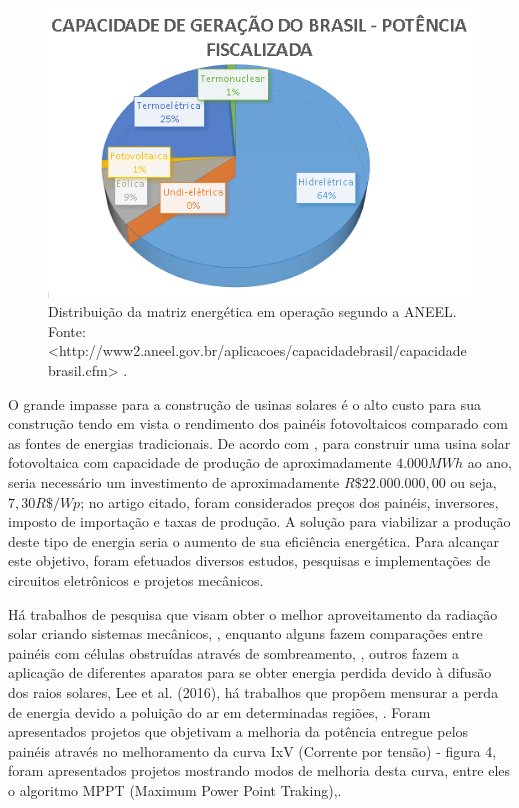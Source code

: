 \FloatBarrier
\begin{figure}[htbp]
	\centering
	\includegraphics[scale=1.0]{imagens/FontesEnergia}
	\caption{Distribuição da matriz energética em operação segundo a ANEEL. Fonte:<http://www2.aneel.gov.br/aplicacoes/capacidadebrasil/capacidadebrasil.cfm> \cite{aneel}. }
	
	\label{fig:FonteEnergia}
\end{figure}
\FloatBarrier

O grande impasse para a construção de usinas solares é o alto custo para sua construção tendo em vista o rendimento dos painéis fotovoltaicos comparado  com as fontes de energias tradicionais. De acordo com , para construir uma usina solar fotovoltaica com capacidade de produção de aproximadamente $4.000MWh$ ao ano, seria necessário um investimento de aproximadamente $R\$ 22.000.000,00$ ou seja, $7,30 R\$/Wp$; no artigo citado, foram considerados preços dos painéis, inversores, imposto de importação e taxas de produção. A solução para viabilizar a produção deste tipo de energia seria o aumento de sua eficiência energética. Para alcançar este objetivo, foram efetuados diversos estudos, pesquisas e implementações de circuitos eletrônicos e projetos mecânicos.
 
Há trabalhos de pesquisa que visam obter o melhor aproveitamento da radiação solar criando sistemas mecânicos, ,  enquanto alguns fazem comparações entre painéis com células obstruídas através de sombreamento, , outros fazem a aplicação de diferentes aparatos para se obter energia perdida devido à difusão dos raios solares, Lee et al. (2016), há trabalhos que propõem mensurar a perda de energia devido a poluição do ar em determinadas regiões, . Foram apresentados projetos que objetivam a melhoria da potência entregue pelos painéis através no melhoramento da curva IxV (Corrente por tensão) - figura 4, foram apresentados projetos mostrando modos de melhoria desta curva, entre eles o algoritmo MPPT (Maximum Power Point Traking),.  

